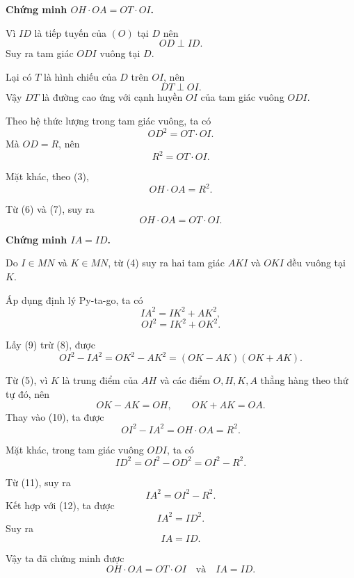 \begin{bt}[3,0 điểm]
{\begin{enumerate}
	\medskip
	\textbf{Chứng minh $OH\cdot OA=OT\cdot OI$.}
	
	Vì $ID$ là tiếp tuyến của $(O)$ tại $D$ nên
	\[
	OD\perp ID.
	\]
	Suy ra tam giác $ODI$ vuông tại $D$.
	
	Lại có $T$ là hình chiếu của $D$ trên $OI$, nên
	\[
	DT\perp OI.
	\]
	Vậy $DT$ là đường cao ứng với cạnh huyền $OI$ của tam giác vuông $ODI$.
	
	Theo hệ thức lượng trong tam giác vuông, ta có
	\[
	OD^2=OT\cdot OI.
	\]
	Mà $OD=R$, nên
	\[
	R^2=OT\cdot OI. \tag{6}
	\]
	
	Mặt khác, theo (3),
	\[
	OH\cdot OA=R^2. \tag{7}
	\]
	
	Từ (6) và (7), suy ra
	\[
	OH\cdot OA=OT\cdot OI.
	\]
	
	\medskip
	\textbf{Chứng minh $IA=ID$.}
	
	Do $I\in MN$ và $K\in MN$, từ (4) suy ra hai tam giác $AKI$ và $OKI$ đều vuông tại $K$.
	
	Áp dụng định lý Py-ta-go, ta có
	\[
	IA^2=IK^2+AK^2, \tag{8}
	\]
	\[
	OI^2=IK^2+OK^2. \tag{9}
	\]
	
	Lấy (9) trừ (8), được
	\[
	OI^2-IA^2=OK^2-AK^2=(OK-AK)(OK+AK). \tag{10}
	\]
	
	Từ (5), vì $K$ là trung điểm của $AH$ và các điểm $O,H,K,A$ thẳng hàng theo thứ tự đó, nên
	\[
	OK-AK=OH,
	\qquad
	OK+AK=OA.
	\]
	Thay vào (10), ta được
	\[
	OI^2-IA^2=OH\cdot OA=R^2. \tag{11}
	\]
	
	Mặt khác, trong tam giác vuông $ODI$, ta có
	\[
	ID^2=OI^2-OD^2=OI^2-R^2. \tag{12}
	\]
	
	Từ (11), suy ra
	\[
	IA^2=OI^2-R^2.
	\]
	Kết hợp với (12), ta được
	\[
	IA^2=ID^2.
	\]
	Suy ra
	\[
	IA=ID.
	\]
	
	Vậy ta đã chứng minh được
	\[
	OH\cdot OA=OT\cdot OI
	\quad \text{và} \quad
	IA=ID.
	\]
	\end{enumerate}
	}
\end{bt}
